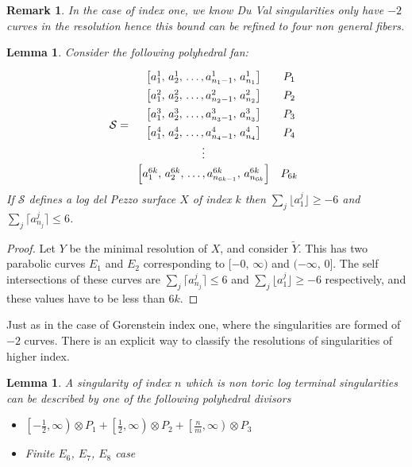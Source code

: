 \documentclass[12pt,a4paper]{book}      %
\newtheorem{lem}[thm]{Lemma}
\newtheorem*{rem}{Remark}
\begin{document}
\begin{rem}
In the case of index one, we know Du Val singularities only have $-2$ curves in the resolution hence this bound can be refined to four non general fibers.
\end{rem}

\begin{lem}{\label{MaxLength}}
Consider the following polyhedral fan:
\[\def\arraystretch{1.4}
\mathcal{S} = 
\begin{array}{cc}
\left[a_1^1, \, a_2^1,\,  \dots, a_{n_1 - 1}^1, \, a_{n_1}^1 \right] & P_1 \\
\left[a_1^2, \, a_2^2,\,  \dots, a_{n_2 - 1}^2, \, a_{n_2}^2 \right] & P_2 \\
\left[a_1^3, \, a_2^3,\,  \dots, a_{n_3 - 1}^3, \, a_{n_3}^3 \right] & P_3 \\
\left[a_1^4, \, a_2^4,\,  \dots, a_{n_4 - 1}^4, \, a_{n_4}^4 \right] & P_4 \\
\vdots \\
\left[ a_1^{6k}, \, a_2^{6k}, \,  \dots, a_{n_{6k-1}}^{6k}, \, a_{n_{6k}}^{6k} \right] & P_{6k} \\
\end{array}
\] 
If $\mathcal{S}$ defines a log del Pezzo surface $X$ of index $k$ then $\sum_j \lfloor a_1^j \rfloor \geq -6$ and $\sum_j \lceil a_{n_j}^{j} \rceil \leq 6$.
\end{lem}
\begin{proof}
Let $Y$ be the minimal resolution of $X$, and consider $\widetilde{Y}$. This has two parabolic curves $E_1$ and $E_2$ corresponding to $[-0, \, \infty)$ and $(-\infty, \, 0]$. The self intersections of these curves are $\sum_j \lceil a_{n_j}^{j} \rceil \leq 6$ and $\sum_j \lfloor a_1^j \rfloor \geq -6$ respectively, and these values have to be less than $6k$.
\end{proof}

Just as in the case of Gorenstein index one, where the singularities are formed of $-2$ curves. There is an explicit way to classify the resolutions of singularities of higher index.

\begin{lem}\label{basic bound}
A singularity of index $n$ which is non toric log terminal singularities can be described by one of the following polyhedral divisors
\begin{itemize}
\item $\left[-\frac{1}{2}, \infty \right) \otimes P_1 + \left[ \frac{1}{2}, \infty \right) \otimes P_2 + \left[ \frac{n}{m}, \infty \right) \otimes P_3$

\item Finite $E_6$, $E_7$, $E_8$ case
\end{itemize}
\end{lem}
\end{document}
